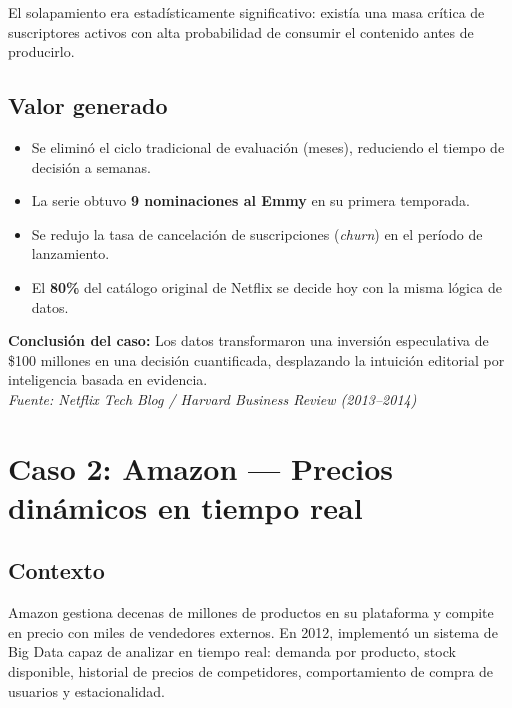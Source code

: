 \documentclass[12pt, a4paper]{article}
\begin{document}
El solapamiento era estadísticamente significativo: existía una masa crítica de suscriptores activos con alta probabilidad de consumir el contenido antes de producirlo.

\subsection{Valor generado}

\begin{itemize}[leftmargin=1.5cm]
  \item Se eliminó el ciclo tradicional de evaluación (meses), reduciendo el tiempo de decisión a semanas.
  \item La serie obtuvo \textbf{9 nominaciones al Emmy} en su primera temporada.
  \item Se redujo la tasa de cancelación de suscripciones (\textit{churn}) en el período de lanzamiento.
  \item El \textbf{80\%} del catálogo original de Netflix se decide hoy con la misma lógica de datos.
\end{itemize}

\begin{conclusionbox}
\textbf{Conclusión del caso:} Los datos transformaron una inversión especulativa de \$100 millones en una decisión cuantificada, desplazando la intuición editorial por inteligencia basada en evidencia.\\[4pt]
\textit{\small Fuente: Netflix Tech Blog / Harvard Business Review (2013--2014)}
\end{conclusionbox}


\section{Caso 2: Amazon --- Precios dinámicos en tiempo real}

\subsection{Contexto}

Amazon gestiona decenas de millones de productos en su plataforma y compite en precio con miles de vendedores externos. En 2012, implementó un sistema de Big Data capaz de analizar en tiempo real: demanda por producto, stock disponible, historial de precios de competidores, comportamiento de compra de usuarios y estacionalidad.
\end{document}
